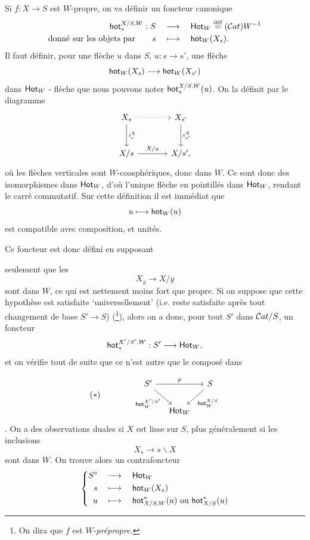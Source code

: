 Si $f : X\longrightarrow S$ est $W$-propre, on va définir un foncteur canonique
\[
\begin{aligned}
\mathsf{hot}_*^{X/S,W} : S &\quad\longrightarrow\quad \mathsf{Hot}_W\overset{\text{déf}}{=}(\mathcal{C}at)W^{-1}\\
\text{donné sur les objets par}\qquad s &\quad\longmapsto\quad \mathsf{hot}_W(X_s).
\end{aligned}
\]
Il faut définir, pour une flèche $u$ dans $S$, $u : s\longrightarrow s'$, une flèche
\[
\mathsf{hot}_W(X_s)\longrightarrow\mathsf{hot}_W(X_{s'})
\]
dans $\mathsf{Hot}_W$ - flèche que nous pouvons noter $\mathsf{hot}_*^{X/S,W}(u)$. On la définit par le diagramme
\[
\begin{tikzcd}[row sep=large, column sep=large]
X_s \arrow[r, dotted] \arrow[d, "i_s^X"] & X_{s'} \arrow[d, "i_{s'}^X"] \\
X/s \arrow[r, "X/u"] & X/s',
\end{tikzcd}
\]
où les flèches verticales sont $W$-coasphériques, donc dans $W$. Ce sont donc des isomorphismes dans $\mathsf{Hot}_W$, d'où l'unique flèche en pointillés dans $\mathsf{Hot}_W$, rendant le carré commutatif. Sur cette définition il est immédiat que
\[
u\longmapsto\mathsf{hot}_W(u)
\]
est compatible avec composition, et unités.

Ce foncteur est donc défini en supposant

\leavevmode{}seulement que les
\[
X_y\longrightarrow X/y
\]
sont dans $W$, ce qui est nettement moins fort que propre. Si on suppose que cette hypothèse est satisfaite `universellement' (i.e. reste satisfaite après tout changement de base $S'\longrightarrow S$) (\footnote[45]{On dira que $f$ est $W$-\textit{prépropre.}}), alors on a donc, pour tout $S'$ dans $\mathcal{C}at/S$, un foncteur
\[
\mathsf{hot}_*^{X'/S',W} : S'\longrightarrow\mathsf{Hot}_W,
\]
et on vérifie tout de suite que ce n'est autre que le composé dans

\[
(*)\qquad\qquad
\begin{tikzcd}[column sep=small]
S' \arrow[rr, "p"] \arrow[dr, "\hot_W^{X'/S'}"'] & & S \arrow[dl, "\hot_W^{X/S}"] \\
& \Hot_W &
\end{tikzcd}
\]
. On a des observations duales si $X$ est lisse sur $S$, plus généralement si les inclusions
\[
X_s\longrightarrow s\backslash X
\]
sont dans $W$. On trouve alors un contrafoncteur
\[
\left\{
\begin{aligned}
S^\circ &\quad\longrightarrow\quad \Hot_W\\
s &\quad\longmapsto\quad \hot_W(X_s)\\
u &\quad\longmapsto\quad \hot^*_{X/S,W}(u)\ \text{ou}\ \hot^*_{X/S}(u)
\end{aligned}
\right.
\]

